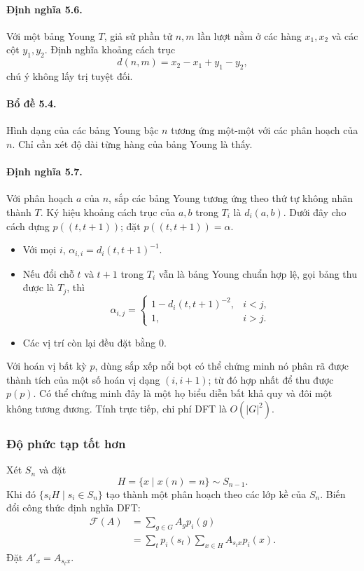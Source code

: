 \documentclass[11pt]{article}
\begin{document}
\paragraph{Định nghĩa 5.6.}
Với một bảng Young $T$, giả sử phần tử $n,m$ lần lượt nằm ở các hàng
$x_1,x_2$ và các cột $y_1,y_2$. Định nghĩa khoảng cách trục
\[
  d(n,m)=x_2-x_1+y_1-y_2,
\]
chú ý không lấy trị tuyệt đối.

\paragraph{Bổ đề 5.4.}
Hình dạng của các bảng Young bậc $n$ tương ứng một-một với các phân hoạch của
$n$. Chỉ cần xét độ dài từng hàng của bảng Young là thấy.

\paragraph{Định nghĩa 5.7.}
Với phân hoạch $a$ của $n$, sắp các bảng Young tương ứng theo thứ tự không nhãn
thành $T$. Ký hiệu khoảng cách trục của $a,b$ trong $T_i$ là $d_i(a,b)$. Dưới
đây cho cách dựng $p((t,t+1))$; đặt $p((t,t+1))=\alpha$.
\begin{itemize}
  \item Với mọi $i$, $\alpha_{i,i}=d_i(t,t+1)^{-1}$.
  \item Nếu đổi chỗ $t$ và $t+1$ trong $T_i$ vẫn là bảng Young chuẩn hợp lệ, gọi
  bảng thu được là $T_j$, thì
  \[
    \alpha_{i,j}=
    \begin{cases}
      1-d_i(t,t+1)^{-2},& i<j,\\
      1,& i>j.
    \end{cases}
  \]
  \item Các vị trí còn lại đều đặt bằng $0$.
\end{itemize}
Với hoán vị bất kỳ $p$, dùng sắp xếp nổi bọt có thể chứng minh nó phân rã được
thành tích của một số hoán vị dạng $(i,i+1)$; từ đó hợp nhất để thu được
$p(p)$. Có thể chứng minh đây là một họ biểu diễn bất khả quy và đôi một không
tương đương. Tính trực tiếp, chi phí DFT là $O(|G|^2)$.

\subsubsection{Độ phức tạp tốt hơn}

Xét $S_n$ và đặt
\[
  H=\{x\mid x(n)=n\}\sim S_{n-1}.
\]
Khi đó $\{s_iH\mid s_i\in S_n\}$ tạo thành một phân hoạch theo các lớp kề của
$S_n$. Biến đổi công thức định nghĩa DFT:
\[
\begin{aligned}
\mathcal F(A)
&=\sum_{g\in G} A_gp_i(g)\\
&=\sum_t p_i(s_t)\sum_{x\in H} A_{s_tx}p_i(x).
\end{aligned}
\]
Đặt $A'_x=A_{s_tx}$.
\end{document}
